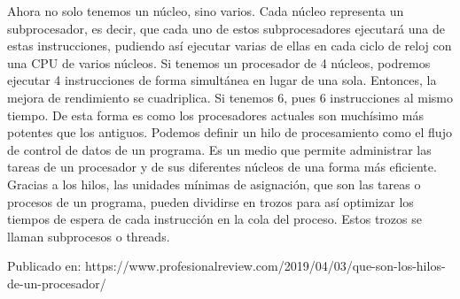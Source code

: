 \documentclass[conference]{IEEEtran}
\begin{document}
Ahora no solo tenemos un núcleo, sino varios. Cada núcleo representa un subprocesador, es decir, que cada uno de estos subprocesadores ejecutará una de estas instrucciones, pudiendo así ejecutar varias de ellas en cada ciclo de reloj con una CPU de varios núcleos. Si tenemos un procesador de 4 núcleos, podremos ejecutar 4 instrucciones de forma simultánea en lugar de una sola. Entonces, la mejora de rendimiento se cuadriplica. Si tenemos 6, pues 6 instrucciones al mismo tiempo. De esta forma es como los procesadores actuales son muchísimo más potentes que los antiguos.
Podemos definir un hilo de procesamiento como el flujo de control de datos de un programa. Es un medio que permite administrar las tareas de un procesador y de sus diferentes núcleos de una forma más eficiente. Gracias a los hilos, las unidades mínimas de asignación, que son las tareas o procesos de un programa, pueden dividirse en trozos para así optimizar los tiempos de espera de cada instrucción en la cola del proceso. Estos trozos se llaman subprocesos o threads.

 
Publicado en: https://www.profesionalreview.com/2019/04/03/que-son-los-hilos-de-un-procesador/
\end{document}
